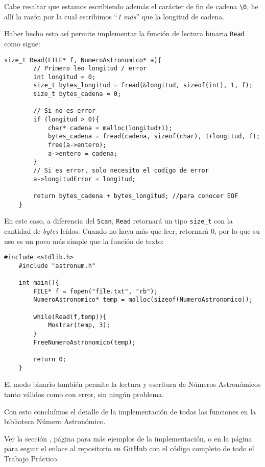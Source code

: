 \documentclass[a4paper, 12pt]{article}
\begin{document}
Cabe resaltar que estamos escribiendo además el carácter de fin de cadena \verb|\0|, he allí la razón por la cual escribimos ``\emph{1 más}'' que la longitud de cadena.

Haber hecho esto así permite implementar la función de lectura binaria \verb|Read| como sigue:

\begin{lstlisting}[style=C]
    size_t Read(FILE* f, NumeroAstronomico* a){
        // Primero leo longitud / error
        int longitud = 0;
        size_t bytes_longitud = fread(&longitud, sizeof(int), 1, f);
        size_t bytes_cadena = 0;
    
        // Si no es error
        if (longitud > 0){
            char* cadena = malloc(longitud+1);
            bytes_cadena = fread(cadena, sizeof(char), 1+longitud, f);
            free(a->entero);
            a->entero = cadena;
        }
        // Si es error, solo necesito el codigo de error
        a->longitudError = longitud;
    
        return bytes_cadena + bytes_longitud; //para conocer EOF
    }
\end{lstlisting}

En este caso, a diferencia del \texttt{Scan}, \texttt{Read} retornará un tipo \verb|size_t| con la cantidad de \emph{bytes} leídos. Cuando no haya más que leer, retornará 0, por lo que su uso es un poco más simple que la función de texto:

\begin{lstlisting}[style=C]
    #include <stdlib.h>
    #include "astronum.h"
    
    int main(){
        FILE* f = fopen("file.txt", "rb");
        NumeroAstronomico* temp = malloc(sizeof(NumeroAstronomico));
        
        while(Read(f,temp)){
            Mostrar(temp, 3);
        }
        FreeNumeroAstronomico(temp);
        
        return 0;
    }
\end{lstlisting}

El modo binario también permite la lectura y escritura de Números Astronómicos tanto válidos como con error, sin ningún problema.

Con esto concluímos el detalle de la implementación de todas las funciones en la biblioteca Número Astronómico.

Ver la sección , página \pageref{ejemplos} para más ejemplos de la implementación, o en la página \pageref{github} para seguir el enlace al repositorio en GitHub con el código completo de todo el Trabajo Práctico.
\end{document}
